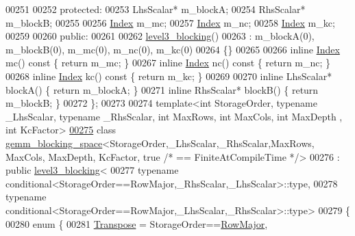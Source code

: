 \begin{DoxyCode}
00251 
00252   \textcolor{keyword}{protected}:
00253     LhsScalar* m\_blockA;
00254     RhsScalar* m\_blockB;
00255 
00256     \hyperlink{namespace_eigen_a62e77e0933482dafde8fe197d9a2cfde}{Index} m\_mc;
00257     \hyperlink{namespace_eigen_a62e77e0933482dafde8fe197d9a2cfde}{Index} m\_nc;
00258     \hyperlink{namespace_eigen_a62e77e0933482dafde8fe197d9a2cfde}{Index} m\_kc;
00259 
00260   \textcolor{keyword}{public}:
00261 
00262     \hyperlink{class_eigen_1_1internal_1_1level3__blocking}{level3\_blocking}()
00263       : m\_blockA(0), m\_blockB(0), m\_mc(0), m\_nc(0), m\_kc(0)
00264     \{\}
00265 
00266     \textcolor{keyword}{inline} \hyperlink{namespace_eigen_a62e77e0933482dafde8fe197d9a2cfde}{Index} mc()\textcolor{keyword}{ const }\{ \textcolor{keywordflow}{return} m\_mc; \}
00267     \textcolor{keyword}{inline} \hyperlink{namespace_eigen_a62e77e0933482dafde8fe197d9a2cfde}{Index} nc()\textcolor{keyword}{ const }\{ \textcolor{keywordflow}{return} m\_nc; \}
00268     \textcolor{keyword}{inline} \hyperlink{namespace_eigen_a62e77e0933482dafde8fe197d9a2cfde}{Index} kc()\textcolor{keyword}{ const }\{ \textcolor{keywordflow}{return} m\_kc; \}
00269 
00270     \textcolor{keyword}{inline} LhsScalar* blockA() \{ \textcolor{keywordflow}{return} m\_blockA; \}
00271     \textcolor{keyword}{inline} RhsScalar* blockB() \{ \textcolor{keywordflow}{return} m\_blockB; \}
00272 \};
00273 
00274 \textcolor{keyword}{template}<\textcolor{keywordtype}{int} StorageOrder, \textcolor{keyword}{typename} \_LhsScalar, \textcolor{keyword}{typename} \_RhsScalar, \textcolor{keywordtype}{int} MaxRows, \textcolor{keywordtype}{int} MaxCols, \textcolor{keywordtype}{int} MaxDepth
      , \textcolor{keywordtype}{int} KcFactor>
\hyperlink{class_eigen_1_1internal_1_1gemm__blocking__space_3_01_storage_order_00_01___lhs_scalar_00_01___reb401dd40e11c548a7d5e4b85e19f682}{00275} \textcolor{keyword}{class }\hyperlink{class_eigen_1_1internal_1_1gemm__blocking__space}{gemm\_blocking\_space}<StorageOrder,\_LhsScalar,\_RhsScalar,MaxRows, MaxCols, MaxDepth,
       KcFactor, true \textcolor{comment}{/* == FiniteAtCompileTime */}>
00276   : \textcolor{keyword}{public} \hyperlink{class_eigen_1_1internal_1_1level3__blocking}{level3\_blocking}<
00277       typename conditional<StorageOrder==RowMajor,\_RhsScalar,\_LhsScalar>::type,
00278       typename conditional<StorageOrder==RowMajor,\_LhsScalar,\_RhsScalar>::type>
00279 \{
00280     \textcolor{keyword}{enum} \{
00281       \hyperlink{group___core___module_class_eigen_1_1_transpose}{Transpose} = StorageOrder==\hyperlink{group__enums_ggaacded1a18ae58b0f554751f6cdf9eb13acfcde9cd8677c5f7caf6bd603666aae3}{RowMajor},

\end{DoxyCode}
